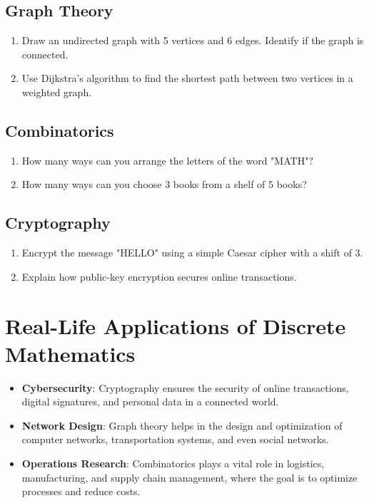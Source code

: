 \subsection{Graph Theory}
\begin{enumerate}
    \item Draw an undirected graph with 5 vertices and 6 edges. Identify if the graph is connected.
    \item Use Dijkstra’s algorithm to find the shortest path between two vertices in a weighted graph.
\end{enumerate}

\subsection{Combinatorics}
\begin{enumerate}
    \item How many ways can you arrange the letters of the word "MATH"?
    \item How many ways can you choose 3 books from a shelf of 5 books?
\end{enumerate}

\subsection{Cryptography}
\begin{enumerate}
    \item Encrypt the message "HELLO" using a simple Caesar cipher with a shift of 3.
    \item Explain how public-key encryption secures online transactions.
\end{enumerate}

\section{Real-Life Applications of Discrete Mathematics}
\begin{itemize}
    \item \textbf{Cybersecurity}: Cryptography ensures the security of online transactions, digital signatures, and personal data in a connected world.
    \item \textbf{Network Design}: Graph theory helps in the design and optimization of computer networks, transportation systems, and even social networks.
    \item \textbf{Operations Research}: Combinatorics plays a vital role in logistics, manufacturing, and supply chain management, where the goal is to optimize processes and reduce costs.
\end{itemize}

